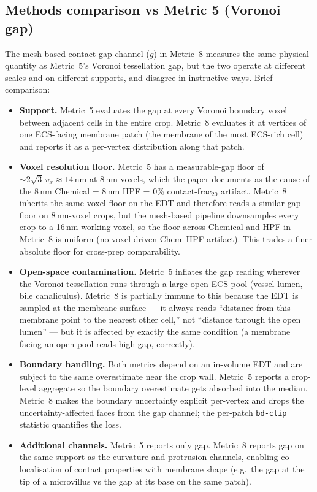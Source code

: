 \subsection*{Methods comparison vs Metric 5 (Voronoi gap)}
\label{sec:membrane-vs-voronoi}

The mesh-based contact gap channel ($g$) in Metric~8 measures the same
physical quantity as Metric~5's Voronoi tessellation gap, but the two
operate at different scales and on different supports, and disagree
in instructive ways. Brief comparison:

\begin{itemize}[nosep]
\item \textbf{Support.} Metric~5 evaluates the gap at every Voronoi
boundary voxel between adjacent cells in the entire crop. Metric~8
evaluates it at vertices of one ECS-facing membrane patch (the
membrane of the most ECS-rich cell) and reports it as a per-vertex
distribution along that patch.

\item \textbf{Voxel resolution floor.} Metric~5 has a measurable-gap
floor of $\sim 2\sqrt{3}\, v_x \approx 14$\,nm at 8\,nm voxels, which
the paper documents as the cause of the 8\,nm Chemical = 8\,nm HPF =
0\% contact-frac$_{20}$ artifact. Metric~8 inherits the same voxel
floor on the EDT and therefore reads a similar gap floor on
8\,nm-voxel crops, but the mesh-based pipeline downsamples every crop
to a 16\,nm working voxel, so the floor across Chemical and HPF in
Metric~8 is uniform (no voxel-driven Chem--HPF artifact). This
trades a finer absolute floor for cross-prep comparability.

\item \textbf{Open-space contamination.} Metric~5 inflates the
gap reading wherever the Voronoi tessellation runs through a
large open ECS pool (vessel lumen, bile canaliculus). Metric~8 is
partially immune to this because the EDT is sampled at the membrane
surface --- it always reads ``distance from this membrane point to
the nearest other cell,'' not ``distance through the open lumen''
--- but it is affected by exactly the same condition (a membrane
facing an open pool reads high gap, correctly).

\item \textbf{Boundary handling.} Both metrics depend on an
in-volume EDT and are subject to the same overestimate near the
crop wall. Metric~5 reports a crop-level aggregate so the boundary
overestimate gets absorbed into the median. Metric~8 makes the
boundary uncertainty explicit per-vertex and drops the
uncertainty-affected faces from the gap channel; the per-patch
\texttt{bd-clip} statistic quantifies the loss.

\item \textbf{Additional channels.} Metric~5 reports only gap.
Metric~8 reports gap on the same support as the curvature and
protrusion channels, enabling co-localisation of contact properties
with membrane shape (e.g.~the gap at the tip of a microvillus vs
the gap at its base on the same patch).
\end{itemize}

